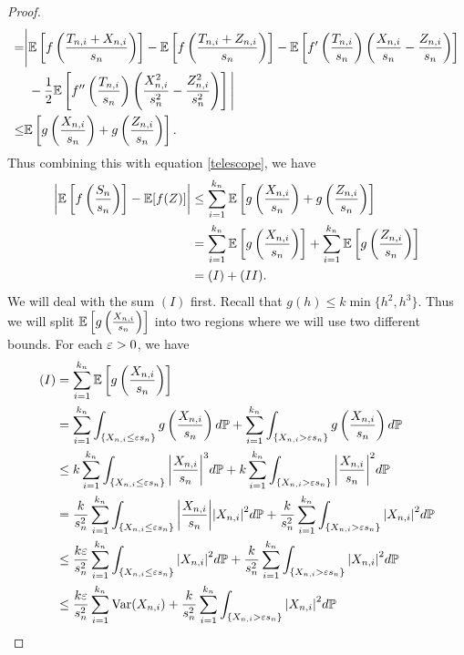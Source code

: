 \begin{proof}
\begin{align*}
    =&\Bigg|{\mathbb{E}}\left[f\left(\frac{T_{n,i}+X_{n,i}}{s_n}\right)\right]-{\mathbb{E}}\left[f\left(\frac{T_{n,i}+Z_{n,i}}{s_n}\right)\right]-{\mathbb{E}}\left[f'\left(\frac{T_{n,i}}{s_n}\right)\left(\frac{X_{n,i}}{s_n}-\frac{Z_{n,i}}{s_n}\right)\right]\\
    &~-\frac{1}{2}{\mathbb{E}}\left[f''\left(\frac{T_{n,i}}{s_n}\right)\left(\frac{X_{n,i}^2}{s_n^2}-\frac{Z_{n,i}^2}{s_n^2}\right)\right]\Bigg|\\
    \le&{\mathbb{E}}\left[g\left(\frac{X_{n,i}}{s_n}\right)+g\left(\frac{Z_{n,i}}{s_n}\right) \right].
\end{align*}
Thus combining this with equation \eqref{telescope}, we have
\begin{align*}
    {\left\lvert{\mathbb{E}}\left[f\left(\frac{S_n}{s_n}\right)\right]-{\mathbb{E}}[f(Z)]\right\rvert}&\le \sum_{i=1}^{k_n}
    {\mathbb{E}}\left[g\left(\frac{X_{n,i}}{s_n}\right)+g\left(\frac{Z_{n,i}}{s_n}\right) \right]\\
    &=\sum_{i=1}^{k_n}{\mathbb{E}}\left[g\left(\frac{X_{n,i}}{s_n}\right)\right] +\sum_{i=1}^{k_n}{\mathbb{E}}\left[g\left(\frac{Z_{n,i}}{s_n}\right)\right]\\
    &=(I)+(II).
\end{align*}
We will deal with the sum $(I)$ first. Recall that $g(h) \le k\min\{h^2,h^3\}$. Thus we will split ${\mathbb{E}}\left[g\left(\frac{X_{n,i}}{s_n}\right)\right]$ into two regions where we will use two different bounds. For each $\varepsilon > 0$, we have
\begin{align*}
    (I) &=\sum_{i=1}^{k_n} \E\left[g\left(\frac{X_{n,i}}{s_n}\right)\right]\\
    &=\sum_{i=1}^{k_n} \int_{\{X_{n,i} \le \eps s_n\}} g\left(\frac{X_{n,i}}{s_n}\right)d\Pa + \sum_{i=1}^{k_n}\int_{\{X_{n,i}  > \eps s_n \}} g\left(\frac{X_{n,i}}{s_n}\right)d\Pa\\
    &\le k\sum_{i=1}^{k_n} \int_{\{X_{n,i} \le \eps s_n\}} \abs{\frac{X_{n,i}}{s_n}}^3d\Pa + k\sum_{i=1}^{k_n}\int_{\{X_{n,i}  > \eps s_n \}}\abs{\frac{X_{n,i}}{s_n}}^2d\Pa\\
    &=\frac{k}{s_n^2}\sum_{i=1}^{k_n} \int_{\{X_{n,i} \le \eps s_n\}} \abs{\frac{X_{n,i}}{s_n}}\abs{X_{n,i}}^2d\Pa + \frac{k}{s_n^2}\sum_{i=1}^{k_n}\int_{\{X_{n,i}  > \eps s_n \}}\abs{X_{n,i}}^2d\Pa   \\
    &\le  \frac{k\eps }{s_n^2}\sum_{i=1}^{k_n} \int_{\{X_{n,i} \le \eps s_n\}} \abs{X_{n,i}}^2d\Pa + \frac{k}{s_n^2}\sum_{i=1}^{k_n}\int_{\{X_{n,i}  > \eps s_n \}}\abs{X_{n,i}}^2d\Pa \\
    &\le\frac{k\eps }{s_n^2}\sum_{i=1}^{k_n}\V(X_{n,i}) + \frac{k}{s_n^2}\sum_{i=1}^{k_n}\int_{\{X_{n,i}  > \eps s_n \}}\abs{X_{n,i}}^2d\Pa \\

\end{align*}
\end{proof}
